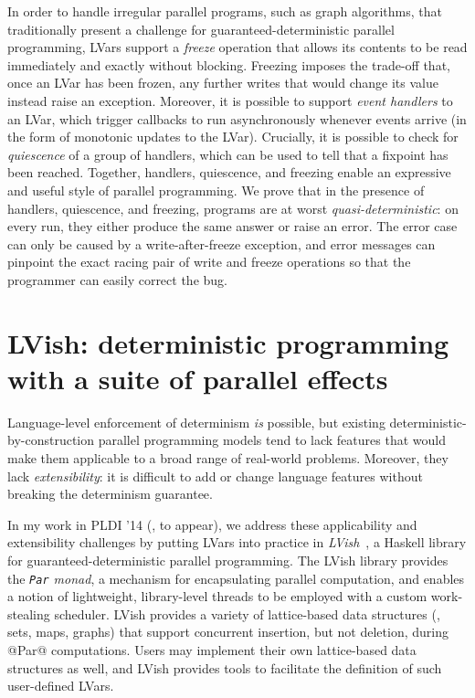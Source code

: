 \documentclass{article}
\begin{document}
In order to handle irregular parallel programs, such as graph
algorithms, that traditionally present a challenge for
guaranteed-deterministic parallel programming, LVars support a
\emph{freeze} operation that allows its contents to be read
immediately and exactly without blocking. Freezing imposes the
trade-off that, once an LVar has been frozen, any further writes that
would change its value instead raise an exception.  Moreover, it is
possible to support \emph{event handlers} to an LVar, which trigger
callbacks to run asynchronously whenever events arrive (in the form of
monotonic updates to the LVar).  Crucially, it is possible to check
for \emph{quiescence} of a group of handlers, which can be used to
tell that a fixpoint has been reached.  Together, handlers,
quiescence, and freezing enable an expressive and useful style of
parallel programming.  We prove that in the presence of handlers,
quiescence, and freezing, programs are at worst
\emph{quasi-deterministic}: on every run, they either produce the same
answer or raise an error.  The error case can only be caused by a
write-after-freeze exception, and error messages can pinpoint the
exact racing pair of write and freeze operations so that the
programmer can easily correct the bug.

\section{LVish: deterministic programming with a suite of parallel effects}\label{effectzoo}

Language-level enforcement of determinism \emph{is} possible, but
existing deterministic-by-construction parallel programming models
tend to lack features that would make them applicable to a broad range
of real-world problems. Moreover, they lack \emph{extensibility}: it
is difficult to add or change language features without breaking the
determinism guarantee.

In my work in PLDI '14 (\cite{effectzoo}, to appear), we address these
applicability and extensibility challenges by putting LVars into
practice in \emph{LVish}~\cite{LVish}, a Haskell library for
guaranteed-deterministic parallel programming.  The LVish library
provides the \emph{\lstinline|Par| monad}, a mechanism for
encapsulating parallel computation, and enables a notion of
lightweight, library-level threads to be employed with a custom
work-stealing scheduler.  LVish provides a variety of lattice-based
data structures (\eg, sets, maps, graphs) that support concurrent
insertion, but not deletion, during @Par@ computations.  Users may
implement their own lattice-based data structures as well, and LVish
provides tools to facilitate the definition of such user-defined
LVars.
\end{document}
